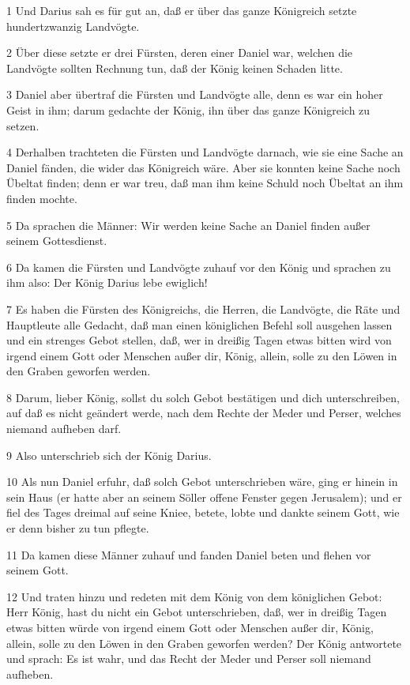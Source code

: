 \par 1 Und Darius sah es für gut an, daß er über das ganze Königreich setzte hundertzwanzig Landvögte.
\par 2 Über diese setzte er drei Fürsten, deren einer Daniel war, welchen die Landvögte sollten Rechnung tun, daß der König keinen Schaden litte.
\par 3 Daniel aber übertraf die Fürsten und Landvögte alle, denn es war ein hoher Geist in ihm; darum gedachte der König, ihn über das ganze Königreich zu setzen.
\par 4 Derhalben trachteten die Fürsten und Landvögte darnach, wie sie eine Sache an Daniel fänden, die wider das Königreich wäre. Aber sie konnten keine Sache noch Übeltat finden; denn er war treu, daß man ihm keine Schuld noch Übeltat an ihm finden mochte.
\par 5 Da sprachen die Männer: Wir werden keine Sache an Daniel finden außer seinem Gottesdienst.
\par 6 Da kamen die Fürsten und Landvögte zuhauf vor den König und sprachen zu ihm also: Der König Darius lebe ewiglich!
\par 7 Es haben die Fürsten des Königreichs, die Herren, die Landvögte, die Räte und Hauptleute alle Gedacht, daß man einen königlichen Befehl soll ausgehen lassen und ein strenges Gebot stellen, daß, wer in dreißig Tagen etwas bitten wird von irgend einem Gott oder Menschen außer dir, König, allein, solle zu den Löwen in den Graben geworfen werden.
\par 8 Darum, lieber König, sollst du solch Gebot bestätigen und dich unterschreiben, auf daß es nicht geändert werde, nach dem Rechte der Meder und Perser, welches niemand aufheben darf.
\par 9 Also unterschrieb sich der König Darius.
\par 10 Als nun Daniel erfuhr, daß solch Gebot unterschrieben wäre, ging er hinein in sein Haus (er hatte aber an seinem Söller offene Fenster gegen Jerusalem); und er fiel des Tages dreimal auf seine Kniee, betete, lobte und dankte seinem Gott, wie er denn bisher zu tun pflegte.
\par 11 Da kamen diese Männer zuhauf und fanden Daniel beten und flehen vor seinem Gott.
\par 12 Und traten hinzu und redeten mit dem König von dem königlichen Gebot: Herr König, hast du nicht ein Gebot unterschrieben, daß, wer in dreißig Tagen etwas bitten würde von irgend einem Gott oder Menschen außer dir, König, allein, solle zu den Löwen in den Graben geworfen werden? Der König antwortete und sprach: Es ist wahr, und das Recht der Meder und Perser soll niemand aufheben.
